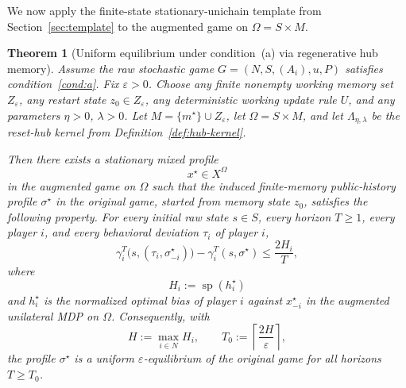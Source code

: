 \documentclass[11pt]{article}
\newtheorem{theorem}{Theorem}[section]
\theoremstyle{definition}
\newcommand{\1}{\mathbf{1}}
\DeclareMathOperator{\spn}{sp}
\begin{document}
We now apply the finite-state stationary-unichain template from Section~\ref{sec:template} to the augmented game on $\Omega=S\times M$.

\begin{theorem}[Uniform equilibrium under condition~(a) via regenerative hub memory]\label{thm:main}
Assume the raw stochastic game $G=(N,S,(A_i),u,P)$ satisfies condition~\ref{cond:a}. Fix $\varepsilon>0$. Choose any finite nonempty working memory set $Z_\varepsilon$, any restart state $z_0\in Z_\varepsilon$, any deterministic working update rule $U$, and any parameters $\eta>0$, $\lambda>0$. Let $M=\{m^\star\}\cup Z_\varepsilon$, let $\Omega=S\times M$, and let $\Lambda_{\eta,\lambda}$ be the reset-hub kernel from Definition~\ref{def:hub-kernel}.

Then there exists a stationary mixed profile
\[
x^\star\in X^\Omega
\]
in the augmented game on $\Omega$ such that the induced finite-memory public-history profile $\sigma^\star$ in the original game, started from memory state $z_0$, satisfies the following property. For every initial raw state $s\in S$, every horizon $T\ge1$, every player $i$, and every behavioral deviation $\tau_i$ of player $i$,
\begin{equation}\label{eq:main-regret-raw}
\gamma_i^T\bigl(s,(\tau_i,\sigma_{-i}^\star)\bigr)-\gamma_i^T(s,\sigma^\star)
\le \frac{2H_i}{T},
\end{equation}
where
\[
H_i:=\spn(h_i^\star)
\]
and $h_i^\star$ is the normalized optimal bias of player $i$ against $x_{-i}^\star$ in the augmented unilateral MDP on $\Omega$. Consequently, with
\[
H:=\max_{i\in N}H_i,
\qquad
T_0:=\left\lceil\frac{2H}{\varepsilon}\right\rceil,
\]
the profile $\sigma^\star$ is a uniform $\varepsilon$-equilibrium of the original game for all horizons $T\ge T_0$.
\end{theorem}
\end{document}
